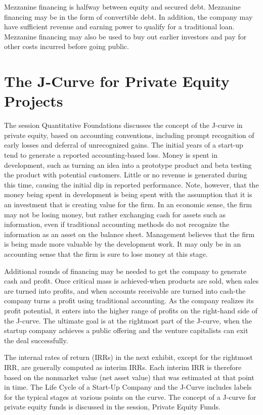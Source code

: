 \documentclass[11pt]{article}
\begin{document}
Mezzanine financing is halfway between equity and secured debt. Mezzanine financing may be in the form of convertible debt. In addition, the company may have sufficient revenue and earning power to qualify for a traditional loan. Mezzanine financing may also be used to buy out earlier investors and pay for other costs incurred before going public.

\section*{The J-Curve for Private Equity Projects}
The session Quantitative Foundations discusses the concept of the J-curve in private equity, based on accounting conventions, including prompt recognition of early losses and deferral of unrecognized gains. The initial years of a start-up tend to generate a reported accounting-based loss. Money is spent in development, such as turning an idea into a prototype product and beta testing the product with potential customers. Little or no revenue is generated during this time, causing the initial dip in reported performance. Note, however, that the money being spent in development is being spent with the assumption that it is an investment that is creating value for the firm. In an economic sense, the firm may not be losing money, but rather exchanging cash for assets such as information, even if traditional accounting methods do not recognize the information as an asset on the balance sheet. Management believes that the firm is being made more valuable by the development work. It may only be in an accounting sense that the firm is sure to lose money at this stage.

Additional rounds of financing may be needed to get the company to generate cash and profit. Once critical mass is achieved-when products are sold, when sales are turned into profits, and when accounts receivable are turned into cash-the company turns a profit using traditional accounting. As the company realizes its profit potential, it enters into the higher range of profits on the right-hand side of the J-curve. The ultimate goal is at the rightmost part of the J-curve, when the startup company achieves a public offering and the venture capitalists can exit the deal successfully.

The internal rates of return (IRRs) in the next exhibit, except for the rightmost IRR, are generally computed as interim IRRs. Each interim IRR is therefore based on the nonmarket value (net asset value) that was estimated at that point in time. The Life Cycle of a Start-Up Company and the J-Curve includes labels for the typical stages at various points on the curve. The concept of a J-curve for private equity funds is discussed in the session, Private Equity Funds.
\end{document}
